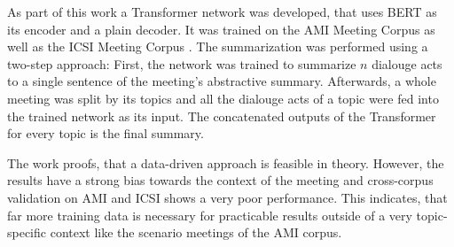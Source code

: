 As part of this work a Transformer network \cite{1706.03762} was developed, that uses BERT as its encoder and a plain decoder.
It was trained on the AMI Meeting Corpus \cite{Mccowan05theami} as well as the ICSI Meeting Corpus \cite{Janin}.
The summarization was performed using a two-step approach:
First, the network was trained to summarize \(n\) dialouge acts to a single sentence of the meeting's abstractive summary.
Afterwards, a whole meeting was split by its topics and all the dialouge acts of a topic were fed into the trained network as its input.
The concatenated outputs of the Transformer for every topic is the final summary.

The work proofs, that a data-driven approach is feasible in theory.
However, the results have a strong bias towards the context of the meeting and cross-corpus validation on AMI and ICSI shows a very poor performance.
This indicates, that far more training data is necessary for practicable results outside of a very topic-specific context like the scenario meetings of the AMI corpus. 